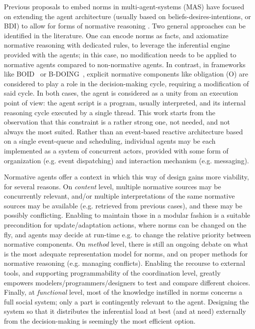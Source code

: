 Previous proposals to embed norms in multi-agent-systems (MAS) have focused on extending the agent architecture (usually based on beliefs-desires-intentions, or BDI) to allow for forms of normative reasoning \cite{Dignum2002MotivationalNorms,Broersen01theboid,Tufis2017,Criado2010TowardsCompliance}. Two general approaches can be identified in the literature. One can encode norms as facts, and axiomatize normative reasoning with dedicated rules, to leverage the inferential engine provided with the agents; in this case, no modification needs to be applied to normative agents compared to non-normative agents. In contrast, in frameworks like BOID~\cite{Broersen01theboid} or B-DOING~\cite{Dignum2002MotivationalNorms}, explicit normative components like obligation (O) are considered to play a role in the decision-making cycle, requiring a modification of said cycle. In both cases, the agent is considered as a unity from an execution point of view: the agent script is a program, usually interpreted, and its internal reasoning cycle executed by a single thread. This work starts from the observation that this constraint is a rather strong one, not needed, and not always the most suited. Rather than an event-based reactive architecture based on a single event-queue and scheduling, individual agents may be each implemented as a system of concurrent actors, provided with some form of organization (e.g. event dispatching) and interaction mechanism (e.g. messaging).%

Normative agents offer a context in which this way of design gains more viability, for several reasons. On \textit{content} level, multiple normative sources may be concurrently relevant, and/or multiple interpretations of the same normative sources may be available (e.g. retrieved from previous cases), and these may be possibly conflicting. Enabling to maintain those in a modular fashion is a suitable precondition for update/adaptation actions, where norms can be changed on the fly, and agents may decide at run-time e.g. to change the relative priority between normative components. On \textit{method} level, there is still an ongoing debate on what is the most adequate representation model for norms, and on proper methods for normative reasoning (e.g. managing conflicts). Enabling the recourse to external tools, and supporting programmability of the coordination level, greatly empowers modelers/programmers/designers to test and compare different choices. Finally, at \textit{functional} level, most of the knowledge instilled in norms concerns a full social system; only a part is contingently relevant to the agent. Designing the system so that it distributes the inferential load at best (and at need) externally from the decision-making is seemingly the most efficient option.

